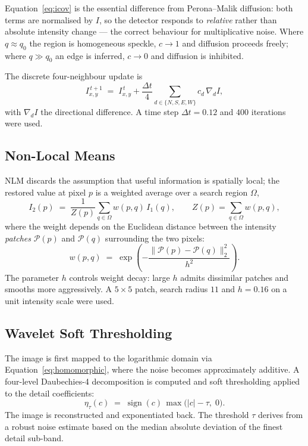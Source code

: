 \documentclass[12pt,a4paper,oneside]{report}
\begin{document}
Equation~\eqref{eq:icov} is the essential difference from Perona--Malik
diffusion: both terms are normalised by $I$, so the detector responds to
\emph{relative} rather than absolute intensity change --- the correct behaviour
for multiplicative noise. Where $q \approx q_0$ the region is homogeneous speckle,
$c \to 1$ and diffusion proceeds freely; where $q \gg q_0$ an edge is inferred,
$c \to 0$ and diffusion is inhibited.

The discrete four-neighbour update is
\begin{equation}
I^{\,t+1}_{x,y} \;=\; I^{\,t}_{x,y}
  + \frac{\Delta t}{4}\!\!\sum_{d\in\{N,S,E,W\}}\!\! c_d \,\nabla_d I ,
\label{eq:sradupdate}
\end{equation}
with $\nabla_d I$ the directional difference. A time step
$\Delta t = 0.12$ and $400$ iterations were used.

\subsection{Non-Local Means}

NLM \cite{buades2005nlm} discards the assumption that useful information is
spatially local; the restored value at pixel $p$ is a weighted average over a
search region $\Omega$,
\begin{equation}
I_2(p) \;=\; \frac{1}{Z(p)}\sum_{q\in\Omega} w(p,q)\, I_1(q),
\qquad
Z(p)=\sum_{q\in\Omega} w(p,q),
\label{eq:nlm}
\end{equation}
where the weight depends on the Euclidean distance between the intensity
\emph{patches} $\mathcal{P}(p)$ and $\mathcal{P}(q)$ surrounding the two pixels:
\begin{equation}
w(p,q) \;=\;
   \exp\!\left(-\frac{\bigl\|\mathcal{P}(p)-\mathcal{P}(q)\bigr\|_2^{2}}{h^{2}}\right).
\label{eq:nlmweight}
\end{equation}
The parameter $h$ controls weight decay: large $h$ admits dissimilar patches and
smooths more aggressively. A $5\times5$ patch, search radius $11$ and $h=0.16$ on
a unit intensity scale were used.

\subsection{Wavelet Soft Thresholding}

The image is first mapped to the logarithmic domain via
Equation~\eqref{eq:homomorphic}, where the noise becomes approximately additive. A
four-level Daubechies-4 decomposition is computed and soft thresholding
\cite{donoho1995wavelet} applied to the detail coefficients:
\begin{equation}
\eta_\tau(c) \;=\; \operatorname{sign}(c)\,\max\bigl(|c|-\tau,\;0\bigr).
\label{eq:soft}
\end{equation}
The image is reconstructed and exponentiated back. The threshold $\tau$ derives
from a robust noise estimate based on the median absolute deviation of the finest
detail sub-band.
\end{document}
